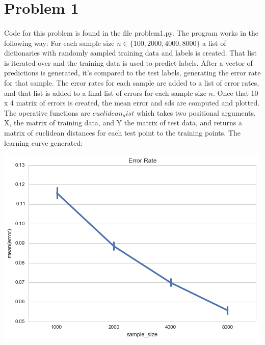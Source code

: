 \documentclass[12pt]{article}
\begin{document}
\maketitle

\section{Problem 1} 
\paragraph{} Code for this problem is found in the file problem1.py. The program works in the following way: For each sample size $n \in \{100, 2000, 4000, 8000\}$ a list of dictionaries with randomly sampled training data and labels is created.  That list is iterated over and the training data is used to predict labels.  After a vector of predictions is generated, it's compared to the test labels, generating the error rate for that sample.  The error rates for each sample are added to a list of error rates, and that list is added to a final list of errors for each sample size $n$.  Once that 10 x 4 matrix of errors is created, the mean error and sds are computed and plotted.  The operative functions are $euclidean_dist$ which takes two positional arguments, X, the matrix of training data, and Y the matrix of test data, and returns a matrix of euclidean distances for each test point to the training points. The learning curve generated:

\begin{center}
\includegraphics[scale=.5]{images/nn_error_rate}	
\end{center}
\end{document}
